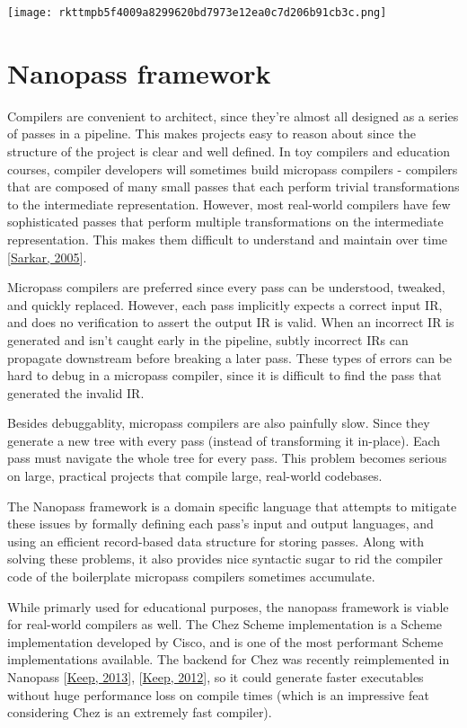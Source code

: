 \documentclass{book}
\let\SOriginalthesubsubsection\thesubsubsection
\newcommand{\Ssubsection}[2]{\subsection[#1]{#2}\let\thesubsubsection\SOriginalthesubsubsection}
\renewcommand{\Ssubsection}[2]{\section[#1]{#2}}
\begin{document}
\texttt{[image: rkttmpb5f4009a8299620bd7973e12ea0c7d206b91cb3c.png]}

\Ssubsection{Nanopass framework}{Nanopass framework}\label{t:x28part_x22Nanopassx5fframeworkx22x29}

Compilers are convenient to architect, since they{'}re almost all designed
as a series of passes in a pipeline. This makes projects easy to reason
about since the structure of the project is clear and well defined. In toy
compilers and education courses, compiler developers will sometimes build
micropass compilers {-} compilers that are composed of many small passes
that each perform trivial transformations to the intermediate
representation. However, most real{-}world compilers have few sophisticated
passes that perform multiple transformations on the intermediate
representation. This makes them difficult to understand and maintain over
time [\hyperref[t:x28cite_x22Sarkarx2c_2005x22x29]{Sarkar, 2005}].

Micropass compilers are preferred since every pass can be understood,
tweaked, and quickly replaced. However, each pass implicitly expects
a correct input IR, and does no verification to assert the output IR is
valid. When an incorrect IR is generated and isn{'}t caught early in the
pipeline, subtly incorrect IRs can propagate downstream before breaking
a later pass. These types of errors can be hard to debug in a micropass
compiler, since it is difficult to find the pass that generated the
invalid IR.

Besides debuggablity, micropass compilers are also painfully slow. Since
they generate a new tree with every pass (instead of transforming it
in{-}place). Each pass must navigate the whole tree for every pass. This
problem becomes serious on large, practical projects that compile large,
real{-}world codebases.

The Nanopass framework is a domain specific language that attempts to
mitigate these issues by formally defining each pass{'}s input and output
languages, and using an efficient record{-}based data structure for storing
passes. Along with solving these problems, it also provides nice syntactic
sugar to rid the compiler code of the boilerplate micropass compilers
sometimes accumulate.

While primarly used for educational purposes, the nanopass framework is
viable for real{-}world compilers as well. The Chez Scheme implementation is
a Scheme implementation developed by Cisco, and is one of the most
performant Scheme implementations available. The backend for Chez was
recently reimplemented in Nanopass [\hyperref[t:x28cite_x22Keepx2c_2013x22x29]{Keep, 2013}], [\hyperref[t:x28cite_x22Keepx2c_2012x22x29]{Keep, 2012}],
so it could generate faster executables without huge performance loss on
compile times (which is an impressive feat considering Chez is an
extremely fast compiler).
\end{document}

